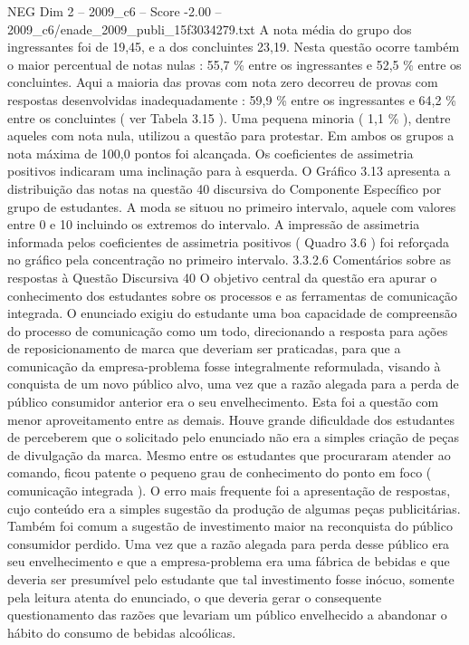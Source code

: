 \begin{textsample}{NEG Dim 2 – 2009\_c6 – Score -2.00 – 2009\_c6/enade\_2009\_publi\_15f3034279.txt}
A nota média do grupo dos ingressantes foi de 19,45, e a dos concluintes 23,19.
Nesta questão ocorre também o maior percentual de notas nulas : 55,7 \% entre os ingressantes e 52,5 \% entre os concluintes.
Aqui a maioria das provas com nota zero decorreu de provas com respostas desenvolvidas inadequadamente : 59,9 \% entre os ingressantes e 64,2 \% entre os concluintes ( ver Tabela 3.15 ).
Uma pequena minoria ( 1,1 \% ), dentre aqueles com nota nula, utilizou a questão para protestar.
Em ambos os grupos a nota máxima de 100,0 pontos foi alcançada.
Os coeficientes de assimetria positivos indicaram uma inclinação para à esquerda.
O Gráfico 3.13 apresenta a distribuição das notas na questão 40 discursiva do Componente Específico por grupo de estudantes.
A moda se situou no primeiro intervalo, aquele com valores entre 0 e 10 incluindo os extremos do intervalo.
A impressão de assimetria informada pelos coeficientes de assimetria positivos ( Quadro 3.6 ) foi reforçada no gráfico pela concentração no primeiro intervalo. 3.3.2.6 Comentários sobre as respostas à Questão Discursiva 40 O objetivo central da questão era apurar o conhecimento dos estudantes sobre os processos e as ferramentas de comunicação integrada.
O enunciado exigiu do estudante uma boa capacidade de compreensão do processo de comunicação como um todo, direcionando a resposta para ações de reposicionamento de marca que deveriam ser praticadas, para que a comunicação da empresa-problema fosse integralmente reformulada, visando à conquista de um novo público alvo, uma vez que a razão alegada para a perda de público consumidor anterior era o seu envelhecimento.
Esta foi a questão com menor aproveitamento entre as demais.
Houve grande dificuldade dos estudantes de perceberem que o solicitado pelo enunciado não era a simples criação de peças de divulgação da marca.
Mesmo entre os estudantes que procuraram atender ao comando, ficou patente o pequeno grau de conhecimento do ponto em foco ( comunicação integrada ).
O erro mais frequente foi a apresentação de respostas, cujo conteúdo era a simples sugestão da produção de algumas peças publicitárias.
Também foi comum a sugestão de investimento maior na reconquista do público consumidor perdido.
Uma vez que a razão alegada para perda desse público era seu envelhecimento e que a empresa-problema era uma fábrica de bebidas e que deveria ser presumível pelo estudante que tal investimento fosse inócuo, somente pela leitura atenta do enunciado, o que deveria gerar o consequente questionamento das razões que levariam um público envelhecido a abandonar o hábito do consumo de bebidas alcoólicas.

\end{textsample}
